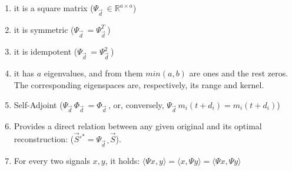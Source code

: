 \documentclass[11pt]{scrartcl} %
\begin{document}
\begin{enumerate}
\item it is a square matrix (\(\Psi_{\vec{d}\;}\in\mathbb{R}^{a\times a}\)\))
\item it is symmetric (\(\Psi_{\vec{d}\;} = \Psi_{\vec{d}\;}^T\))
\item it is idempotent (\(\Psi_{\vec{d}\;} = \Psi_{\vec{d}\;}^2\))
\item it has \(a\) eigenvalues, and from them \(min(a,b)\) are ones and the rest zeros. The corresponding eigenspaces are, respectively, its range and kernel.
\item Self-Adjoint (\(\Psi_{\vec{d}\;}\Phi_{\vec{d}\;} = \Phi_{\vec{d}\;}\), or, conversely, \(\Psi_{\vec{d}\;} m_{i}{\scriptstyle (t+d_i)} = m_i{\scriptstyle (t+d_i)}\))
\item Provides a direct relation between any given original and its optimal reconstruction: (\(\vec{S}'^* = \Psi_{\vec{d}\;^*}\vec{S}\)).
  \item For every two signals \(x,y\), it holds: \(\langle \Psi x, y\rangle = \langle x, \Psi y\rangle= \langle \Psi x, \Psi y \rangle\)
\end{enumerate}

\end{document}
